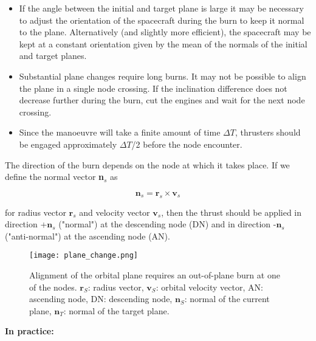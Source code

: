 \documentclass[Orbiter User Manual.tex]{subfiles}
\begin{document}
\begin{itemize}
\item If the angle between the initial and target plane is large it may be necessary to adjust the orientation of the spacecraft during the burn to keep it normal to the plane. Alternatively (and slightly more efficient), the spacecraft may be kept at a constant orientation given by the mean of the normals of the initial and target planes.
\item Substantial plane changes require long burns. It may not be possible to align the plane in a single node crossing. If the inclination difference does not decrease further during the burn, cut the engines and wait for the next node crossing.
\item Since the manoeuvre will take a finite amount of time $\Delta T$, thrusters should be engaged approximately $\Delta T$/2 before the node encounter.
\end{itemize}

\noindent
The direction of the burn depends on the node at which it takes place. If we define the normal vector \textbf{n}$_{s}$ as

\[ \textbf{n}_{s} = \textbf{r}_{s} \times \textbf{v}_{s} \]

\noindent
for radius vector $\textbf{r}_{s}$ and velocity vector $\textbf{v}_{s}$, then the thrust should be applied in direction +$\textbf{n}_{s}$ ("normal") at the descending node (DN) and in direction -$\textbf{n}_{s}$ ("anti-normal") at the ascending node (AN).

\begin{figure}[H]
	\centering
	\texttt{[image: plane\_change.png]}
	\caption{Alignment of the orbital plane requires an out-of-plane burn at one of the nodes. $\textbf{r}_{S}$: radius vector, $\textbf{v}_{S}$: orbital velocity vector, AN: ascending node, DN: descending node, $\textbf{n}_{S}$: normal of the current plane, $\textbf{n}_{T}$: normal of the target plane.}
\end{figure}

\noindent
\textbf{In practice:}
\end{document}
